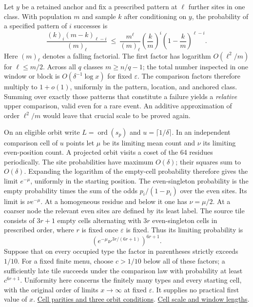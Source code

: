 Let \(y\) be a retained anchor and fix a prescribed pattern at \(\ell\) further sites in one class. With population \(m\) and sample \(k\) after conditioning on \(y\), the probability of a specified pattern of \(i\) successes is
\[
 \frac{(k)_i(m-k)_{\ell-i}}{(m)_\ell}
 \ \le\ \frac{m^\ell}{(m)_\ell}
       \left(\frac{k}{m}\right)^i
       \left(1-\frac{k}{m}\right)^{\ell-i}.
\]
Here \((m)_\ell\) denotes a falling factorial. The first factor has logarithm \(O(\ell^2/m)\) for \(\ell\le m/2\). Across all \(q\) classes \(m\ge n/q-1\); the total number inspected in one window or block is \(O(\delta^{-1}\log x)\) for fixed \(\varepsilon\). The comparison factors therefore multiply to \(1+o(1)\), uniformly in the pattern, location, and anchored class. Summing over exactly those patterns that constitute a failure yields a \emph{relative} upper comparison, valid even for a rare event. An additive approximation of order \(\ell^2/m\) would leave that crucial scale to be proved again.

On an eligible orbit write \(L=\operatorname{ord}(s_p)\) and \(u=\lceil1/\delta\rceil\). In an independent comparison cell of \(u\) points let \(\mu\) be its limiting mean count and \(\nu\) its limiting even-position count. A projected orbit visits a coset of the 64 residues periodically. The site probabilities have maximum \(O(\delta)\); their squares sum to \(O(\delta)\). Expanding the logarithm of the empty-cell probability therefore gives the limit \(e^{-\mu}\), uniformly in the starting position. The even-singleton probability is the empty probability times the sum of the odds \(p_i/(1-p_i)\) over the even sites. Its limit is \(\nu e^{-\mu}\). At a homogeneous residue and below it one has \(\nu=\mu/2\). At a coarser node the relevant even sites are defined by its least label. The source tile consists of \(3r+1\) empty cells alternating with \(3r\) even-singleton cells in prescribed order, where \(r\) is fixed once \(\varepsilon\) is fixed. Thus its limiting probability is
\[
 \left(e^{-\mu}\nu^{\,3r/(6r+1)}\right)^{6r+1}.
\]
Suppose that on every occupied type the factor in parentheses strictly exceeds \(1/10\). For a fixed finite menu, choose \(c>1/10\) below all of these factors; a sufficiently late tile succeeds under the comparison law with probability at least \(c^{6r+1}\). Uniformity here concerns the finitely many types and every starting cell, with the original order of limits \(x\to\infty\) at fixed \(\varepsilon\). It supplies no practical first value of \(x\).
\href{https://github.com/nousentllc/riemann-hypothesis/blob/40e56bab026552e089d7afcfeff08d2defb9c005/src/Formalism/SubspaceCounting/GoodOrbitIntervalTileCondition.lean#L9-L26}{Cell parities and three orbit conditions}.
\href{https://github.com/nousentllc/riemann-hypothesis/blob/40e56bab026552e089d7afcfeff08d2defb9c005/src/Formalism/SharpRestriction/GrowthBounds/UnramifiedQuadraticSetting.lean#L237-L251}{Cell scale and window lengths}.

